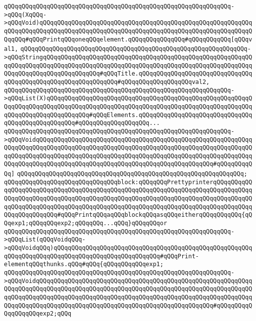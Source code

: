 \verb|qQQqqQQqqQQqqQQqqQQqqQQqqQQqqQQqqQQqqQQqqQQqqQQqqQQqqQQqqQQqqQQq->qQQq(XqQQq->qQQqVoid)qQQqqQQqqQQqqQQqqQQqqQQqqQQqqQQqqQQqqQQqqQQqqQQqqQQqqQQqqQQqqQQqqQQqqQQqqQQqqQQqqQQqqQQqqQQqqQQqqQQqqQQqqQQqqQQqqQQqqQQqqQQqqQQqqQQqqQQq#qQQqPrintqQQqoneqQQqelement.qQQqqQQqqQQqqQQq#qQQqqQQqqQQq[qQQqval1,|\newline
\verb|qQQqqQQqqQQqqQQqqQQqqQQqqQQqqQQqqQQqqQQqqQQqqQQqqQQqqQQqqQQqqQQq->qQQqStringqQQqqQQqqQQqqQQqqQQqqQQqqQQqqQQqqQQqqQQqqQQqqQQqqQQqqQQqqQQqqQQqqQQqqQQqqQQqqQQqqQQqqQQqqQQqqQQqqQQqqQQqqQQqqQQqqQQqqQQqqQQqqQQqqQQqqQQqqQQqqQQqqQQqqQQqqQQq#qQQqTitle.qQQqqQQqqQQqqQQqqQQqqQQqqQQqqQQqqQQqqQQqqQQqqQQqqQQqqQQqqQQqqQQq#qQQqqQQqqQQqqQQqqQQqval2,|\newline
\verb|qQQqqQQqqQQqqQQqqQQqqQQqqQQqqQQqqQQqqQQqqQQqqQQqqQQqqQQqqQQqqQQq->qQQqList(X)qQQqqQQqqQQqqQQqqQQqqQQqqQQqqQQqqQQqqQQqqQQqqQQqqQQqqQQqqQQqqQQqqQQqqQQqqQQqqQQqqQQqqQQqqQQqqQQqqQQqqQQqqQQqqQQqqQQqqQQqqQQqqQQqqQQqqQQqqQQqqQQqqQQqqQQq#qQQqElements.qQQqqQQqqQQqqQQqqQQqqQQqqQQqqQQqqQQqqQQqqQQqqQQqqQQq#qQQqqQQqqQQqqQQqqQQq...|\newline
\verb|qQQqqQQqqQQqqQQqqQQqqQQqqQQqqQQqqQQqqQQqqQQqqQQqqQQqqQQqqQQqqQQq->qQQqVoidqQQqqQQqqQQqqQQqqQQqqQQqqQQqqQQqqQQqqQQqqQQqqQQqqQQqqQQqqQQqqQQqqQQqqQQqqQQqqQQqqQQqqQQqqQQqqQQqqQQqqQQqqQQqqQQqqQQqqQQqqQQqqQQqqQQqqQQqqQQqqQQqqQQqqQQqqQQqqQQqqQQqqQQqqQQqqQQqqQQqqQQqqQQqqQQqqQQqqQQqqQQqqQQqqQQqqQQqqQQqqQQqqQQqqQQqqQQqqQQqqQQqqQQqqQQqqQQqqQQq#qQQqqQQqqQQq]|\newline
\verb|qQQqqQQqqQQqqQQqqQQqqQQqqQQqqQQqqQQqqQQqqQQqqQQqqQQqqQQqqQQqqQQq;|\newline
\newline
\verb|qQQqqQQqqQQqqQQqqQQqqQQqqQQqqQQqblock:qQQqqQQqPrettyprinterqQQqqQQqqQQqqQQqqQQqqQQqqQQqqQQqqQQqqQQqqQQqqQQqqQQqqQQqqQQqqQQqqQQqqQQqqQQqqQQqqQQqqQQqqQQqqQQqqQQqqQQqqQQqqQQqqQQqqQQqqQQqqQQqqQQqqQQqqQQqqQQqqQQqqQQqqQQqqQQqqQQqqQQqqQQqqQQqqQQqqQQqqQQqqQQqqQQqqQQqqQQqqQQqqQQqqQQqqQQqqQQqqQQqqQQqqQQq#qQQqPrintqQQqaqQQqblockqQQqasqQQqeitherqQQqqQQqqQQq{qQQqexp1;qQQqqQQqexp2;qQQqqQQq...qQQq}qQQqqQQqor|\newline
\verb|qQQqqQQqqQQqqQQqqQQqqQQqqQQqqQQqqQQqqQQqqQQqqQQqqQQqqQQqqQQqqQQq->qQQqList(qQQqVoidqQQq->qQQqVoidqQQq)qQQqqQQqqQQqqQQqqQQqqQQqqQQqqQQqqQQqqQQqqQQqqQQqqQQqqQQqqQQqqQQqqQQqqQQqqQQqqQQqqQQqqQQqqQQqqQQqqQQq#qQQqPrint-elementqQQqthunks.qQQq#qQQq{qQQqqQQqqQQqexp1;|\newline
\verb|qQQqqQQqqQQqqQQqqQQqqQQqqQQqqQQqqQQqqQQqqQQqqQQqqQQqqQQqqQQqqQQq->qQQqVoidqQQqqQQqqQQqqQQqqQQqqQQqqQQqqQQqqQQqqQQqqQQqqQQqqQQqqQQqqQQqqQQqqQQqqQQqqQQqqQQqqQQqqQQqqQQqqQQqqQQqqQQqqQQqqQQqqQQqqQQqqQQqqQQqqQQqqQQqqQQqqQQqqQQqqQQqqQQqqQQqqQQqqQQqqQQqqQQqqQQqqQQqqQQqqQQqqQQqqQQqqQQqqQQqqQQqqQQqqQQqqQQqqQQqqQQqqQQqqQQqqQQqqQQqqQQqqQQqqQQq#qQQqqQQqqQQqqQQqqQQqexp2;qQQq|\newline
